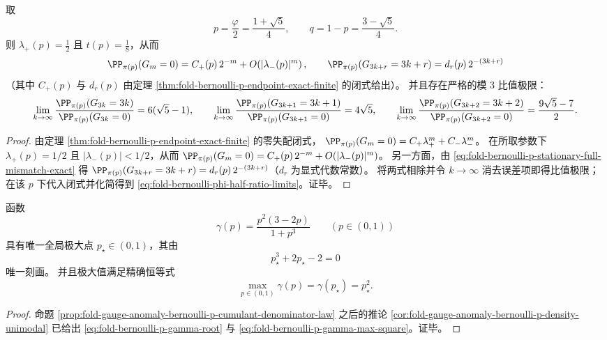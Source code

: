 \begin{corollary}\label{cor:fold-bernoulli-phi-half-ratio-limits}
取
\[
p=\frac{\varphi}{2}=\frac{1+\sqrt5}{4},\qquad q=1-p=\frac{3-\sqrt5}{4}.
\]
则 \(\lambda_+(p)=\tfrac12\) 且 \(t(p)=\tfrac18\)，从而
\[
\PP_{\pi(p)}(G_m=0)=C_+(p)\,2^{-m}+O\!\left(|\lambda_-(p)|^m\right),\qquad
\PP_{\pi(p)}(G_{3k+r}=3k+r)=d_r(p)\,2^{-(3k+r)}
\]
（其中 \(C_+(p)\) 与 \(d_r(p)\) 由定理 \ref{thm:fold-bernoulli-p-endpoint-exact-finite} 的闭式给出）。
并且存在严格的模 \(3\) 比值极限：
\begin{equation}\label{eq:fold-bernoulli-phi-half-ratio-limits}
\lim_{k\to\infty}\frac{\PP_{\pi(p)}(G_{3k}=3k)}{\PP_{\pi(p)}(G_{3k}=0)}=6(\sqrt5-1),\qquad
\lim_{k\to\infty}\frac{\PP_{\pi(p)}(G_{3k+1}=3k+1)}{\PP_{\pi(p)}(G_{3k+1}=0)}=4\sqrt5,\qquad
\lim_{k\to\infty}\frac{\PP_{\pi(p)}(G_{3k+2}=3k+2)}{\PP_{\pi(p)}(G_{3k+2}=0)}=\frac{9\sqrt5-7}{2}.
\end{equation}
\end{corollary}
\begin{proof}
由定理 \ref{thm:fold-bernoulli-p-endpoint-exact-finite} 的零失配闭式，
\(\PP_{\pi(p)}(G_m=0)=C_+\lambda_+^m+C_-\lambda_-^m\)。
在所取参数下 \(\lambda_+(p)=1/2\) 且 \(|\lambda_-(p)|<1/2\)，从而
\(\PP_{\pi(p)}(G_m=0)=C_+(p)\,2^{-m}+O(|\lambda_-(p)|^m)\)。
另一方面，由 \eqref{eq:fold-bernoulli-p-stationary-full-mismatch-exact} 得
\(\PP_{\pi(p)}(G_{3k+r}=3k+r)=d_r(p)\,2^{-(3k+r)}\)（\(d_r\) 为显式代数常数）。
将两式相除并令 \(k\to\infty\) 消去误差项即得比值极限；在该 \(p\) 下代入闭式并化简得到 \eqref{eq:fold-bernoulli-phi-half-ratio-limits}。证毕。
\end{proof}

\begin{proposition}[失配密度的全局最大化与平方最大值恒等式]\label{prop:fold-bernoulli-p-gamma-global-max}
函数
\[
\gamma(p)=\frac{p^2(3-2p)}{1+p^3}\qquad(p\in(0,1))
\]
具有唯一全局极大点 \(p_\star\in(0,1)\)，其由
\begin{equation}\label{eq:fold-bernoulli-p-gamma-root}
p_\star^3+2p_\star-2=0
\end{equation}
唯一刻画。
并且极大值满足精确恒等式
\begin{equation}\label{eq:fold-bernoulli-p-gamma-max-square}
\max_{p\in(0,1)}\gamma(p)=\gamma(p_\star)=p_\star^2.
\end{equation}
\end{proposition}
\begin{proof}
命题
\ref{prop:fold-gauge-anomaly-bernoulli-p-cumulant-denominator-law}
之后的推论 \ref{cor:fold-gauge-anomaly-bernoulli-p-density-unimodal}
已给出 \eqref{eq:fold-bernoulli-p-gamma-root} 与
\eqref{eq:fold-bernoulli-p-gamma-max-square}。证毕。
\end{proof}


